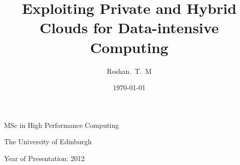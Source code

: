 \documentclass[12pt,a4paper]{report}
\begin{document}




\title{Exploiting Private and Hybrid Clouds for Data-intensive Computing}
\author{Roshan.~T.~M}
\date{\today}

\makeEPCCtitle

\thispagestyle{empty}

\vspace{12cm}

\begin{center}

\large{MSc in High Performance Computing}

\large{The University of Edinburgh}

\large{Year of Presentation: 2012}

\end{center}

\newpage
\end{document}
